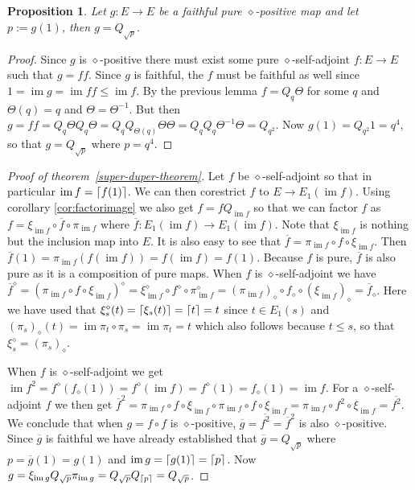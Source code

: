 \documentclass[submission,copyright,creativecommons]{eptcs}
\newcounter{main}
\newtheorem{proposition}[main]{Proposition}
\theoremstyle{definition}
\DeclarePairedDelimiter{\ceil}{\lceil}{\rceil}
\newcommand{\cl}[1]{\overline{#1}}
\DeclareMathOperator{\im}{im}
\begin{document}
\begin{proposition}
	Let $g\colon E\rightarrow E$ be a faithful pure $\diamond$-positive map and let $p:=g(1)$, then $g = Q_{\sqrt{p}}$.
\end{proposition}
\begin{proof}
	Since $g$ is $\diamond$-positive there must exist some pure $\diamond$-self-adjoint $f:E\rightarrow E$ such that $g = ff$. Since $g$ is faithful, the $f$ must be faithful as well since $1=\im{g} = \im{ff} \leq \im{f}$. By the previous lemma $f=Q_q\Theta$ for some $q$ and $\Theta(q) = q$ and $\Theta=\Theta^{-1}$. But then $g = ff = Q_q\Theta Q_q \Theta = Q_qQ_{\Theta(q)}\Theta\Theta = Q_qQ_q\Theta^{-1}\Theta = Q_{q^2}$. Now $g(1) = Q_{q^2}1 = q^4$, so that $g= Q_{\sqrt{p}}$ where $p=q^4$.
\end{proof}

\begin{proof}[Proof of theorem~\ref{super-duper-theorem}]
	Let $f$ be $\diamond$-self-adjoint so that in particular $\im{f} = \ceil{f(1)}$. We can then corestrict $f$ to $E\rightarrow E_1(\im{f})$. Using corollary \ref{cor:factorimage} we also get $f=fQ_{\im{f}}$ so that we can factor $f$ as $f = \xi_{\im{f}}\circ \cl{f}\circ \pi_{\im{f}}$ where $\cl{f}:E_1(\im{f})\rightarrow E_1(\im{f})$. Note that $\xi_{\im{f}}$ is nothing but the inclusion map into $E$. It is also easy to see that $\cl{f} = \pi_{\im{f}}\circ f \circ \xi_{\im{f}}$. Then $\cl{f}(1) = \pi_{\im{f}}(f(\im{f})) = f(\im{f})=f(1)$. Because $f$ is pure, $\cl{f}$ is also pure as it is a composition of pure maps. When $f$ is $\diamond$-self-adjoint we have $\cl{f}^\diamond = (\pi_{\im{f}}\circ f\circ \xi_{\im{f}})^\diamond = \xi_{\im{f}}^\diamond \circ f^\diamond \circ \pi_{\im{f}}^\diamond = (\pi_{\im{f}})_\diamond \circ f_\diamond \circ (\xi_{\im{f}})_\diamond = \cl{f}_\diamond$. Here we have used that $\xi_s^\diamond(t) = \ceil{\xi_s(t)} = \ceil{t} = t$ since $t\in E_1(s)$ and $(\pi_s)_\diamond(t) = \im{\pi_t\circ \pi_s} = \im{\pi_t} = t$ which also follows because $t\leq s$, so that $\xi_s^\diamond = (\pi_s)_\diamond$.

	When $f$ is $\diamond$-self-adjoint we get $\im{f^2} = f^\diamond(f_\diamond(1)) = f^\diamond(\im{f}) = f^\diamond(1) = f_\diamond(1)=\im{f}$. For a $\diamond$-self-adjoint $f$ we then get $\cl{f}^2 = \pi_{\im{f}}\circ f \circ \xi_{\im{f}}\circ \pi_{\im{f}}\circ f \circ \xi_{\im{f}} = \pi_{\im{f}}\circ f^2 \circ \xi_{\im{f}} = \cl{f^2}$. We conclude that when $g=f\circ f$ is $\diamond$-positive, $\cl{g}=\cl{f^2}=\cl{f}^2$ is also $\diamond$-positive. Since $\cl{g}$ is faithful we have already established that $\cl{g} = Q_{\sqrt{p}}$ where $p = \cl{g}(1)=g(1)$ and $\im{g} = \ceil{g(1)} = \ceil{p}$. Now $g=\xi_{\im{g}} Q_{\sqrt{p}} \pi_{\im{g}} = Q_{\sqrt{p}}Q_{\ceil{p}} = Q_{\sqrt{p}}$.
\end{proof}
\end{document}
